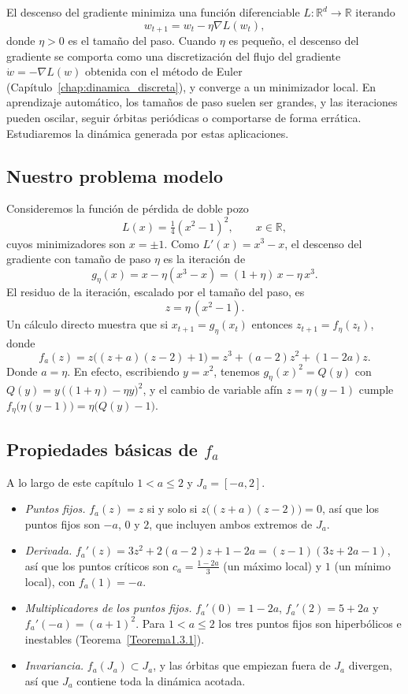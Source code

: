 \documentclass[12pt,a4paper]{report}
\theoremstyle{definition}
\begin{document}
El descenso del gradiente minimiza una función diferenciable $L:\mathbb{R}^d\to\mathbb{R}$ iterando
\[
w_{t+1} = w_t - \eta \nabla L(w_t),
\]
donde $\eta>0$ es el tamaño del paso. Cuando $\eta$ es pequeño, el descenso del gradiente se comporta como una discretización del flujo del gradiente $\dot w = -\nabla L(w)$ obtenida con el método de Euler (Capítulo~\ref{chap:dinamica_discreta}), y converge a un minimizador local. En aprendizaje automático, los tamaños de paso suelen ser grandes, y las iteraciones pueden oscilar, seguir órbitas periódicas o comportarse de forma errática. Estudiaremos la dinámica generada por estas aplicaciones.

\subsection*{Nuestro problema modelo}

Consideremos la función de pérdida de doble pozo
\[
L(x) = \tfrac14 (x^2-1)^2, \qquad x\in\mathbb{R},
\]
cuyos minimizadores son $x=\pm 1$. Como $L'(x) = x^3 - x$, el descenso del gradiente con tamaño de paso $\eta$ es la iteración de
\[
g_\eta(x) = x - \eta (x^3-x) = (1+\eta)\,x - \eta\, x^3 .
\]
El residuo de la iteración, escalado por el tamaño del paso, es
\[
z = \eta\,(x^2-1).
\]
Un cálculo directo muestra que si $x_{t+1} = g_\eta(x_t)$ entonces $z_{t+1} = f_\eta(z_t)$, donde
\[
f_a(z) = z\big((z+a)(z-2)+1\big) = z^3 + (a-2)z^2 + (1-2a)z .
\]
Donde $a = \eta$.
En efecto, escribiendo $y = x^2$, tenemos $g_\eta(x)^2 = Q(y)$ con $Q(y) = y\,\big((1+\eta)-\eta y\big)^2$, y el cambio de variable afín $z = \eta(y-1)$ cumple $f_\eta\big(\eta(y-1)\big) = \eta\big(Q(y)-1\big)$.

\subsection*{Propiedades básicas de $f_a$}

A lo largo de este capítulo $1 < a \le 2$ y $J_a = [-a,2]$.

\begin{itemize}
    \item \emph{Puntos fijos.} $f_a(z) = z$ si y solo si $z\big((z+a)(z-2)\big) = 0$, así que los puntos fijos son $-a$, $0$ y $2$, que incluyen ambos extremos de $J_a$.
    \item \emph{Derivada.} $f_a'(z) = 3z^2 + 2(a-2)z + 1-2a = (z-1)(3z+2a-1)$, así que los puntos críticos son $c_a = \frac{1-2a}{3}$ (un máximo local) y $1$ (un mínimo local), con $f_a(1) = -a$.
    \item \emph{Multiplicadores de los puntos fijos.} $f_a'(0) = 1-2a$, $f_a'(2) = 5+2a$ y $f_a'(-a) = (a+1)^2$. Para $1<a\le 2$ los tres puntos fijos son hiperbólicos e inestables (Teorema~\ref{Teorema1.3.1}).
    \item \emph{Invariancia.} $f_a(J_a)\subset J_a$, y las órbitas que empiezan fuera de $J_a$ divergen, así que $J_a$ contiene toda la dinámica acotada.
\end{itemize}
\end{document}
